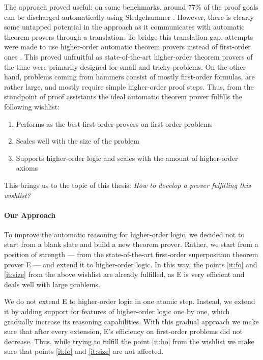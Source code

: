 The approach proved useful: on some benchmarks, around 77\% of the proof goals can be
discharged automatically using Sledgehammer \cite{bgkku-16-larning-fact-selector}. However, there is
clearly some untapped potential in the approach as it communicates with
automatic theorem provers through a translation. To bridge this translation gap,
attempts were made to use higher-order automatic theorem provers instead of
first-order ones \cite{ns-13-leo2sh}. This proved unfruitful as state-of-the-art
higher-order theorem provers of the time were primarily designed for small and
tricky problems. On the other hand, problems coming from hammers consist of
mostly first-order formulas, are rather large, and mostly require simple
higher-order proof steps. Thus, from the standpoint of proof assistants the ideal
automatic theorem prover fulfills the following wishlist:
\begin{enumerate}
  \item\label{it:fo} Performs as the best first-order provers on first-order problems
  \item\label{it:size} Scales well with the size of the problem
  \item\label{it:ho} Supports higher-order logic and scales with the amount of higher-order axioms
\end{enumerate}
This brings us to the topic of this thesis: \emph{How to develop a prover fulfilling this wishlist?}

\paragraph{Our Approach} To improve the automatic reasoning for higher-order
logic, we decided not to start from a blank slate and build a new theorem prover.
Rather, we start from a position of strength --- from the state-of-the-art
first-order superposition theorem prover E \cite{scv-19-e23} --- and extend it to higher-order logic. In this way, the points \ref{it:fo} and
\ref{it:size} from the above wishlist are already fulfilled, as E is very
efficient and deals well with large problems.

We do not extend E to higher-order logic in one atomic step. Instead, we extend
it by adding support for features of higher-order logic one by one,
which gradually increase its reasoning capabilities. With this gradual
approach we make sure that after every extension, E's
efficiency on first-order problems did not decrease. Thus, while trying
to fulfill the point \ref{it:ho} from the wishlist we make sure that points
\ref{it:fo} and \ref{it:size} are not affected.

